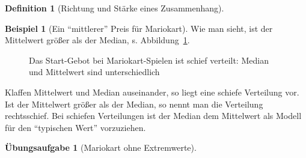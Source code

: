 \documentclass[
  a4paper,
  DIV=11]{scrreprt}
\theoremstyle{definition}
\newtheorem{exercise}{Übungsaufgabe}[chapter]
\theoremstyle{definition}
\newtheorem{example}{Beispiel}[chapter]
\theoremstyle{definition}
\newtheorem{definition}{Definition}[chapter]
\theoremstyle{remark}
\begin{document}
\begin{definition}[Richtung und Stärke eines
Zusammenhang]
\begin{example}[Ein ``mittlerer'' Preis für
Mariokart]
Wie man sieht, ist der Mittelwert größer als der Median, s.
Abbildung~\ref{fig-mario-md}.

\begin{figure}


\caption{\label{fig-mario-md}Das Start-Gebot bei Mariokart-Spielen ist
schief verteilt: Median und Mittelwert sind unterschiedlich}

\end{figure}%

\end{example}

\begin{tcolorbox}[enhanced jigsaw, leftrule=.75mm, opacitybacktitle=0.6, colback=white, colframe=quarto-callout-note-color-frame, coltitle=black, colbacktitle=quarto-callout-note-color!10!white, opacityback=0, left=2mm, breakable, titlerule=0mm, toptitle=1mm, bottomtitle=1mm, rightrule=.15mm, title=\textcolor{quarto-callout-note-color}{\faInfo}\hspace{0.5em}{Hinweis}, arc=.35mm, bottomrule=.15mm, toprule=.15mm]

Klaffen Mittelwert und Median auseinander, so liegt eine schiefe
Verteilung vor. Ist der Mittelwert größer als der Median, so nennt man
die Verteilung rechtsschief. Bei schiefen Verteilungen ist der Median
dem Mittelwert als Modell für den ``typischen Wert'' vorzuziehen.

\end{tcolorbox}

\begin{exercise}[Mariokart ohne
Extremwerte]\protect\hypertarget{exr-mw-no-extrem}{}\label{exr-mw-no-extrem}


\end{exercise}
\end{definition}
\end{document}
